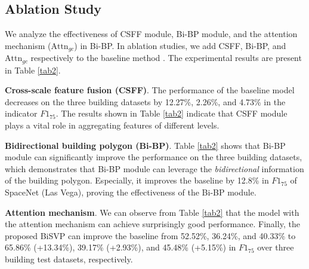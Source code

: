 \documentclass{article}
\begin{document}
\subsection{Ablation Study}
We analyze the effectiveness of CSFF module, Bi-BP module, and the attention mechanism (${\text{Attn}}_{gc}$) in Bi-BP. In ablation studies, we add CSFF, Bi-BP, and ${\text{Attn}}_{gc}$ respectively to the baseline method \cite{he2017maskrcnn}. The experimental results are present in Table \ref{tab2}.

\noindent \textbf{Cross-scale feature fusion (CSFF)}.
The performance of the baseline model decreases on the three building datasets by 12.27\%, 2.26\%, and 4.73\% in the indicator $F1_{75}$. The results shown in Table \ref{tab2} indicate that CSFF module plays a vital role in aggregating features of different levels.

\noindent \textbf{Bidirectional building polygon (Bi-BP)}.
Table \ref{tab2} shows that Bi-BP module can significantly improve the performance on the three building datasets, which demonstrates that Bi-BP module can leverage the \textit{bidirectional} information of the building polygon. Especially, it improves the baseline by 12.8\% in $F1_{75}$ of SpaceNet (Las Vega), proving the effectiveness of the Bi-BP module.

\noindent \textbf{Attention mechanism}.
We can observe from Table \ref{tab2} that the model with the attention mechanism can achieve surprisingly good performance. Finally, the proposed BiSVP can improve the baseline from 52.52\%, 36.24\%, and 40.33\% to 65.86\% (+13.34\%), 39.17\% (+2.93\%), and 45.48\% (+5.15\%) in $F1_{75}$ over three building test datasets, respectively.
\end{document}

